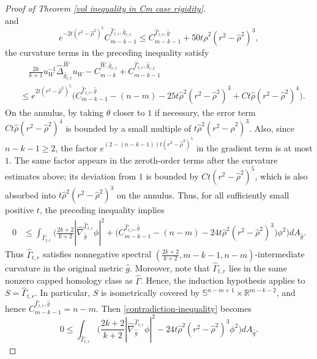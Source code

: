 \documentclass[11pt]{amsart}
\theoremstyle{definition}
\theoremstyle{remark}
\numberwithin{equation}{section}
\begin{document}
\begin{proof}[Proof of Theorem \ref{vol inequality in Cm case rigidity}]
\[    \]
    and
    \[
        e^{-2t(r^2-\hat{\rho}^2)^5}C_{m-k-1}^{\hat{\Gamma}_{t,r},\hat g_{r,t}}
        \leq C_{m-k-1}^{\hat{\Gamma}_{t,r},\hat g}
          +50t\hat\rho^2(r^2-\hat\rho^2)^3,
    \]
    the curvature terms in the preceding inequality satisfy
    \[
    \begin{aligned}
    &\quad \frac{2k}{k+1}u_W^{-1}\hat\Delta^{\hat{W}}_{\hat g_{r,t}}u_W
      -C_{m-k}^{\hat{W},\hat g_{r,t}}
      +C_{m-k-1}^{\hat{\Gamma}_{t,r},\hat g_{r,t}}\\
    &\leq e^{2t(r^2-\hat{\rho}^2)^5}\big(C_{m-k-1}^{\hat{\Gamma}_{t,r},\hat g}
      -(n-m)-25t\hat\rho^2(r^2-\hat\rho^2)^3
      +Ct\hat\rho(r^2-\hat\rho^2)^4\big).
    \end{aligned}
    \]
    On the annulus, by taking $\theta$ closer to $1$ if necessary, the error term
      $Ct\hat\rho(r^2-\hat\rho^2)^4$ is bounded by a small multiple of
      $t\hat\rho^2(r^2-\hat\rho^2)^3$. Also, since $n-k-1\geq2$, the factor
      $e^{(2-(n-k-1))t(r^2-\hat\rho^2)^5}$ in the gradient term is at most $1$. The same factor
      appears in the zeroth-order terms after the curvature estimates above; its deviation from
      $1$ is bounded by $Ct(r^2-\hat\rho^2)^5$, which is also absorbed into
      $t\hat\rho^2(r^2-\hat\rho^2)^3$ on the annulus. Thus, for all sufficiently small positive
      $t$, the preceding inequality implies
    \begin{equation}\label{contradiction-inequality}  \begin{split}
    0&\leq  \int_{\hat{\Gamma}_{t,r}}\bigg(
      \frac{2k+2}{k+2}|\hat\nabla^{\hat{\Gamma}_{t,r}}_{\hat{g}}\phi|^2+\big(C_{m-k-1}^{\hat{\Gamma}_{t,r},\hat{g}}-(n-m)-24t\hat{\rho}^2(r^2-\hat{\rho}^2)^{3}\big)\phi^2 \bigg) dA_{\hat{g}}.
    \end{split}
    \end{equation}
       Thus $\hat{\Gamma}_{t,r}$ satisfies nonnegative spectral
         $(\frac{2k+2}{k+2},m-k-1,n-m)$-intermediate curvature in the original metric $\hat g$.
         Moreover, note that $\hat{\Gamma}_{t,r}$ lies in the same nonzero capped homology class as
         $\hat{\Gamma}$. Hence, the induction hypothesis applies to
         $S=\hat{\Gamma}_{t,r}$. In particular, $S$ is isometrically covered by
         $\mathbb{S}^{n-m+1}\times\mathbb{R}^{m-k-2}$, and hence
         $C_{m-k-1}^{\hat{\Gamma}_{t,r},\hat{g}}=n-m$.
        Then \eqref{contradiction-inequality} becomes
        \begin{equation*}
        0\leq  \int_{\hat{\Gamma}_{t,r}}\bigg(
          \frac{2k+2}{k+2}|\hat\nabla^{\hat{\Gamma}_{t,r}}_{\hat{g}}\phi|^2-24t\hat{\rho}^2(r^2-\hat{\rho}^2)^{3}\phi^2 \bigg) dA_{\hat{g}}.

\end{equation*}
\end{proof}
\end{document}
